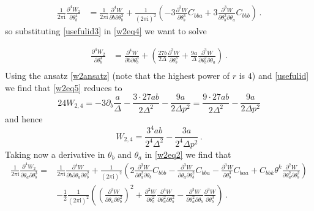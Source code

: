 \documentclass{article}
\theoremstyle{definition}
\numberwithin{equation}{section}
\begin{document}
\begin{equation}\label{w2eq4}
    \begin{split}
        \frac{1}{2\pi \mathrm{i}}\frac{\partial^4 W_2}{\partial \theta_b^4}&=\frac{1}{2\pi \mathrm{i}}\frac{\partial^4 W}{\partial b \partial \theta_b^3}+\frac{1}{(2\pi\mathrm{i})^2}\left(-3\frac{\partial^3W}{\partial \theta_b^3}C_{bba}+3\frac{\partial^3 W}{\partial \theta_b^2 \partial \theta_a}C_{bbb}\right)\,.
    \end{split}
\end{equation}
so substituting \eqref{usefulid3} in \eqref{w2eq4} we want to solve

\begin{equation}\label{w2eq5}
    \begin{split}
        \frac{\partial^4 W_2}{\partial \theta_b^4}&=\frac{\partial^4 W}{\partial b \partial \theta_b^3}+\left(\frac{27b}{2\Delta}\frac{\partial^3W}{\partial \theta_b^3}+\frac{9a}{\Delta}\frac{\partial^3 W}{\partial \theta_b^2 \partial \theta_a}\right)\,.\\
    \end{split}
\end{equation}
Using the ansatz \eqref{w2ansatz} (note that the highest power of $r$ is $4$) and \eqref{usefulid}
we find that \eqref{w2eq5} reduces to
\begin{equation*}
    24W_{2,4}=-3\partial_b\frac{a}{\Delta}-\frac{3\cdot 27ab}{2\Delta^2 }-\frac{9a}{2\Delta p^2}=\frac{9\cdot 27ab}{2\Delta^2}-\frac{9a}{2\Delta p^2}
\end{equation*}
and hence 
\begin{equation*}
    W_{2,4}=\frac{3^4ab}{2^4\Delta^2}-\frac{3a}{2^4\Delta p^2}\,.
\end{equation*}
Taking now a derivative in $\theta_b$ and $\theta_a$ in \eqref{w2eq2}  we find that 
\begin{equation}\label{w2eq6}
    \begin{split}
        \frac{1}{2\pi \mathrm{i}}\frac{\partial^4 W_2}{\partial \theta_a\partial \theta_b^3}=&\frac{1}{2\pi \mathrm{i}}\frac{\partial^4 W}{\partial b \partial \theta_a \partial \theta_b^2}+\frac{1}{(2\pi\mathrm{i})^2}\left(2\frac{\partial^3W}{\partial \theta_a^2 \partial \theta_b}C_{bbb}-\frac{\partial^3W}{\partial \theta_a\partial \theta_b^2}C_{bba}-\frac{\partial^3 W}{\partial \theta_b^3}C_{baa}+C_{bbk}\theta^k\frac{\partial^2W}{\partial \theta_a^2\partial \theta_b^2}\right)\\
        &-\frac{1}{2}\frac{1}{(2\pi\mathrm{i})^2}\left(\left(\frac{\partial^3W}{\partial \theta_a \partial\theta_b^2}\right)^2+\frac{\partial^2W}{\partial \theta_b^2}\frac{\partial^4W}{\partial \theta_a^2 \partial\theta_b^2}-\frac{\partial^3W}{\partial \theta_a^2 \partial\theta_b}\frac{\partial^3W}{ \partial\theta_b^3}\right)\,.
    \end{split}
\end{equation}
\end{document}
